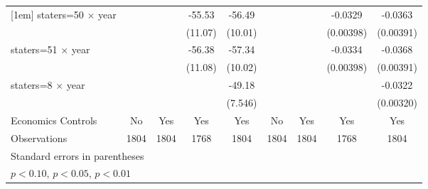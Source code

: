 {\begin{longtable}{l*{8}{c}}
[1em]
staters=50 $\times$ year&                     &                     &      -55.53\sym{***}&      -56.49\sym{***}&                     &                     &     -0.0329\sym{***}&     -0.0363\sym{***}\\
                    &                     &                     &     (11.07)         &     (10.01)         &                     &                     &   (0.00398)         &   (0.00391)         \\
[1em]
staters=51 $\times$ year&                     &                     &      -56.38\sym{***}&      -57.34\sym{***}&                     &                     &     -0.0334\sym{***}&     -0.0368\sym{***}\\
                    &                     &                     &     (11.08)         &     (10.02)         &                     &                     &   (0.00398)         &   (0.00391)         \\
[1em]
staters=8 $\times$ year&                     &                     &                     &      -49.18\sym{***}&                     &                     &                     &     -0.0322\sym{***}\\
                    &                     &                     &                     &     (7.546)         &                     &                     &                     &   (0.00320)         \\
[1em]
Economics Controls  &          No         &         Yes         &         Yes         &         Yes         &          No         &         Yes         &         Yes         &         Yes         \\
\hline
Observations        &        1804         &        1804         &        1768         &        1804         &        1804         &        1804         &        1768         &        1804         \\
\hline\hline
\multicolumn{9}{l}{\footnotesize Standard errors in parentheses}\\
\multicolumn{9}{l}{\footnotesize \sym{*} \(p<0.10\), \sym{**} \(p<0.05\), \sym{***} \(p<0.01\)}\\
\end{longtable}
}
